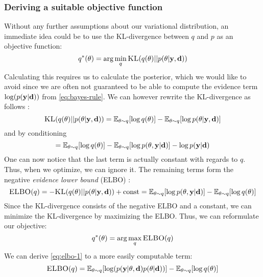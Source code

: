 \subsubsection{Deriving a suitable objective function}
Without any further assumptions about our variational distribution, an immediate idea could be to use the KL-divergence between $q$ and $p$ as an objective function:
\begin{equation}\label{eq:kld}q^*(\theta) = \arg \min_{q} \textsc{KL}(q(\theta) || p(\theta | \mathbf{y}, \mathbf{d}))\end{equation}
Calculating this requires us to calculate the posterior, which we would like to avoid since we are often not guaranteed to be able to compute the evidence term $\log(p(\mathbf{y} | \mathbf{d}))$ from \eqref{eq:bayes-rule}.
We can however rewrite the KL-divergence as follows \cite{blei17}:
\begin{equation}\textsc{KL}(q(\theta)|| p(\theta| \mathbf{y}, \mathbf{d})) = \mathbb{E}_{\theta \sim q}[\log q(\theta)] - \mathbb{E}_{\theta \sim q}[\log p(\theta|\mathbf{y}, \mathbf{d})]\end{equation}
and by conditioning
\begin{equation}\label{eq:kld-2}= \mathbb{E}_{\theta \sim q}[\log q(\theta)] - \mathbb{E}_{\theta \sim q}[\log p(\theta, \mathbf{y}| \mathbf{d})] - \log p(\mathbf{y}| \mathbf{d})\end{equation}
One can now notice that the last term is actually constant with regards to $q$.
Thus, when we optimize, we can ignore it. The remaining terms form the negative \textit{evidence lower bound} (ELBO) \cite{blei17}:
\begin{equation}\label{eq:elbo-1}\textsc{ELBO}(q)= -\textsc{KL}(q(\theta) || p(\theta | \mathbf{y}, \mathbf{d})) + \textrm{const}= \mathbb{E}_{\theta \sim q}[\log p(\theta, \mathbf{y}| \mathbf{d})]-\mathbb{E}_{\theta \sim q}[\log q(\theta)]\end{equation}
Since the KL-divergence consists of the negative ELBO and a constant, we can minimize the KL-divergence by maximizing the ELBO. Thus, we can reformulate our objective:
\begin{equation}\label{eq:elbo-objective}q^*(\theta) = \arg \max_{q} \textsc{ELBO}(q)\end{equation}
We can derive \eqref{eq:elbo-1} to a more easily computable term:
\begin{equation}\label{eq:elbo-2}\textsc{ELBO}(q) = \mathbb{E}_{\theta \sim q}[\log (p(\mathbf{y}| \theta , \mathbf{d})p(\theta | \mathbf{d}))] - \mathbb{E}_{\theta \sim q}[\log q(\theta)]\end{equation}
